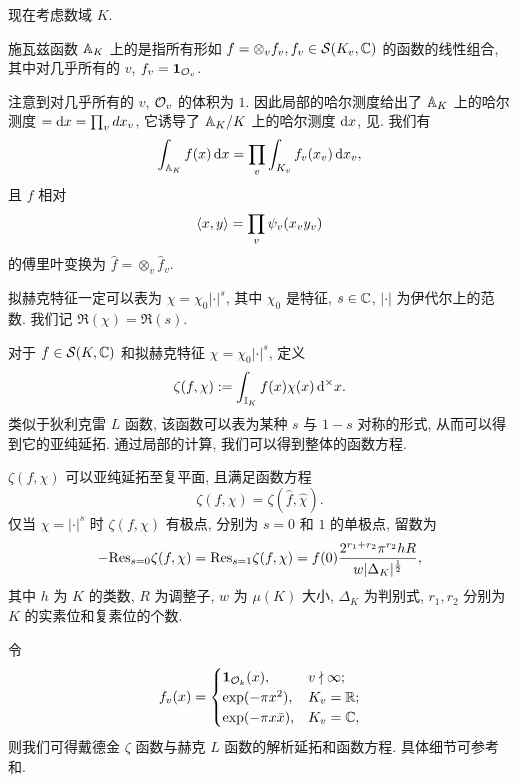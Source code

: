 
现在考虑数域 $K$. 

\begin{definition}{施瓦兹函数}{}
${\mathbb{A}}_K$ 上的是指所有形如 $f=\otimes_v f_v, f_v\in{\mathcal{S}}(K_v,{\mathbb{C}})$ 的函数的线性组合, 其中对几乎所有的 $v$, $f_v={\bf1}_{{\mathcal{O}}_v}$.
\end{definition}

注意到对几乎所有的 $v$, ${\mathcal{O}}_v$ 的体积为 $1$. 因此局部的哈尔测度给出了 ${\mathbb{A}}_K$ 上的哈尔测度 $=\mathop{}\!\mathrm{d} x=\prod_v dx_v$, 它诱导了 ${\mathbb{A}}_K/K$ 上的哈尔测度 $\mathop{}\!\mathrm{d} x$, 见\cite[Chapter XIV, \S 5]{Lang1994}. 我们有
	\[\int_{{\mathbb{A}}_K}f(x)\mathop{}\!\mathrm{d} x=\prod_v \int_{K_v}f_v(x_v)\mathop{}\!\mathrm{d} x_v,\]
且 $f$ 相对
	\[\langle{x,y}\rangle=\prod_v \psi_v(x_v y_v)\]
的傅里叶变换为 $\hat f=\otimes_v \hat f_v$.
%

\begin{exercise}
拟赫克特征一定可以表为 $\chi=\chi_0|\cdot|^s$, 其中 $\chi_0$ 是特征, $s\in{\mathbb{C}}$, $|\cdot|$ 为伊代尔上的范数. 我们记 $\Re(\chi)=\Re(s)$.
\end{exercise}

对于 $f\in{\mathcal{S}}(K,{\mathbb{C}})$ 和拟赫克特征 $\chi=\chi_0|\cdot|^s$, 定义 
	\[\zeta(f,\chi):=\int_{{\mathbb{I}}_K}f(x)\chi(x)\mathop{}\!\mathrm{d}^\times x.\]
类似于狄利克雷 $L$ 函数, 该函数可以表为某种 $s$ 与 $1-s$ 对称的形式, 从而可以得到它的亚纯延拓. 通过局部的计算, 我们可以得到整体的函数方程.

\begin{theorem}{}{}
$\zeta(f,\chi)$ 可以亚纯延拓至复平面, 且满足函数方程
	\[\zeta(f,\chi)=\zeta(\hat f,\hat\chi).\]
仅当 $\chi=|\cdot|^s$ 时 $\zeta(f,\chi)$ 有极点, 分别为 $s=0$ 和 $1$ 的单极点, 留数为
	\[-{\mathrm{Res}}_{s=0}\zeta(f,\chi)={\mathrm{Res}}_{s=1}\zeta(f,\chi)=f(0)\frac{2^{r_1+r_2}\pi^{r_2}h R}{w|\Delta_K|^{\frac{1}{2}}},\]
其中 $h$ 为 $K$ 的类数, $R$ 为调整子, $w$ 为 $\mu(K)$ 大小, $\Delta_K$ 为判别式, $r_1,r_2$ 分别为 $K$ 的实素位和复素位的个数.
\end{theorem}

令
  \[f_v(x)=\begin{cases}
	{\bf 1}_{{\mathcal{O}}_k}(x),\quad& v\nmid \infty;\\
	\exp(-\pi x^2),& K_v={\mathbb{R}};\\
	\exp(-\pi x\bar x),& K_v={\mathbb{C}},
	\end{cases}\]
则我们可得戴德金 $\zeta$ 函数与赫克 $L$ 函数的解析延拓和函数方程. 具体细节可参考\cite[\S 7.5]{KatoKurokawaSaito2009}和\cite[\S 11.2]{KurokawaKuriharaSaito2009}.




